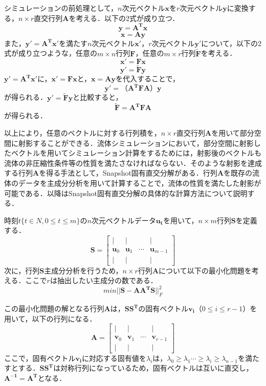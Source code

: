 \documentclass[a4j,12pt]{jreport}
\begin{document}
	シミュレーションの前処理として，$n$次元ベクトル$\bm{x}$を$r$次元ベクトル$\bm{y}$に変換する，$n \times r$直交行列$\mathbf{A}$を考える．以下の2式が成り立つ．
 	\[
 		\bm{y} = \mathbf{A^T}\bm{x}
 	\]
	\[
		\bm{x} = \mathbf{A}\bm{y}
	\]	
	また，$\bm{y'} = \mathbf{A^T}\bm{x'}$を満たす$n$次元ベクトル$\bm{x'}$，$r$次元ベクトル$\bm{y'}$について，以下の2式が成り立つような，任意の$m \times n$行列$\mathbf{F}$，任意の$m \times r$行列$\mathbf{\tilde{F}}$を考える．
	\[
		\bm{x'} = \mathbf{F}\bm{x}
	\]
	\[
		\bm{y'} = \mathbf{\tilde{F}}\bm{y}
	\]
$\bm{y'} = \mathbf{A^T}\bm{x'}$に，$\bm{x'} = \mathbf{F}\bm{x}$と，$\bm{x} = \mathbf{A}\bm{y}$を代入することで，
	\[
		\bm{y'} = （\mathbf{A^T}\mathbf{F}\mathbf{A}）\bm{y}
	\]
	が得られる．$\bm{y'} = \mathbf{\tilde{F}}\bm{y}$と比較すると，
	\[
	\mathbf{\tilde{F}} = \mathbf{A^T}\mathbf{F}\mathbf{A}
	\]
	が得られる．
	
	以上により，任意のベクトルに対する行列積を，$n \times r$直交行列$\mathbf{A}$を用いて部分空間に射影することができる．流体シミュレーションにおいて，部分空間に射影したベクトルを用いてシミュレーション計算をするためには，射影後のベクトルも流体の非圧縮性条件等の性質を満たさなければならない．そのような射影を達成する行列$\mathbf{A}$を得る手法として，Snapshot固有直交分解がある．行列$\mathbf{A}$を既存の流体のデータを主成分分析を用いて計算することで，流体の性質を満たした射影が可能である．以降はSnapshot固有直交分解の具体的な計算方法について説明する．
	
	時刻$t \{t \in N, 0 \le t \le m\}$の$n$次元ベクトルデータ$\bm{u_t}$を用いて，$n\times m$行列$\mathbf{S}$を定義する．
		 \[ \mathbf{S} = 
        		\begin{bmatrix}
   | & | &  & |\\
   \bm{u}_0 & \bm{u}_1 &\cdots  & \bm{u}_{m-1} \\
   | & | &  & |
\end{bmatrix}
\]
	次に，行列$\mathbf{S}$主成分分析を行うため，$n \times r$行列$\mathbf{A}$について以下の最小化問題を考える．ここで$r$は抽出したい主成分の数である．
\[
min || \mathbf{S} -  \mathbf{A}\mathbf{A^T} \mathbf{S}||^2_F
\]


この最小化問題の解となる行列$\mathbf{A}$は，$\mathbf{S}\mathbf{S^T}$の固有ベクトル$\bm{v_i}（0 \le i \le r-1）$を用いて，以下の行列になる．
 \[ 
 \mathbf{A}  = 
        		\begin{bmatrix}
   | & | &  & |\\
   \bm{v}_0 & \bm{v}_1 &\cdots  & \bm{v}_{r-1} \\
   | & | &  & |
\end{bmatrix}
\]
ここで，固有ベクトル$\bm{v_i}$に対応する固有値を$\lambda_i$は，$\lambda_0 \ge \lambda_1 \cdots \ge \lambda_i \ge \lambda_{n-1} $を満たすとする．$\mathbf{S}\mathbf{S^T}$は対称行列になっているため，固有ベクトルは互いに直交し，$\mathbf{A^{-1}} = \mathbf{A^T}$となる．%
\end{document}
